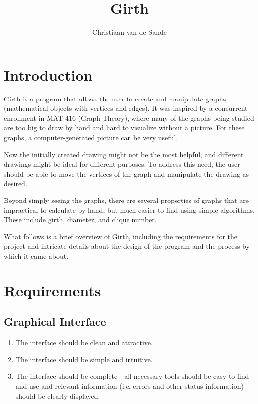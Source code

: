\documentclass{article}
\title{Girth}
\author{Christiaan van de Sande}
\begin{document}
\maketitle

\section{Introduction}

Girth is a program that allows the user to create and manipulate graphs (mathematical objects with vertices and edges).
It was inspired by a concurrent enrollment in MAT 416 (Graph Theory),
where many of the graphs being studied are too big to draw by hand and hard to visualize without a picture.
For these graphs, a computer-generated picture can be very useful.

Now the initially created drawing might not be the most helpful, and different drawings might be ideal for different purposes.
To address this need, the user should be able to move the vertices of the graph and manipulate the drawing as desired.

Beyond simply seeing the graphs, there are several properties of graphs that are impractical to calculate by hand,
but much easier to find using simple algorithms. These include girth, diameter, and clique number.

What follows is a brief overview of Girth,
including the requirements for the project
and intricate details about the design of the program and the process by which it came about.

\section{Requirements}

\subsection{Graphical Interface}
\begin{enumerate}
  \item The interface should be clean and attractive.
  \item The interface should be simple and intuitive.
  \item The interface should be complete - all necessary tools should be easy to find and use
        and relevant information (i.e. errors and other status information) should be clearly displayed.
\end{enumerate}
\end{document}
